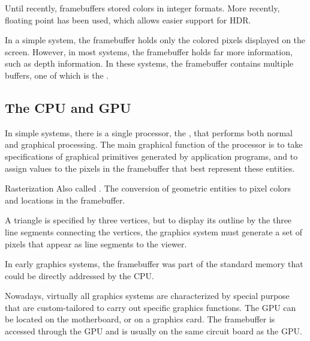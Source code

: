 \documentclass[../COS3712_Notes.tex]{subfiles}
\begin{document}
        Until recently, framebuffers stored colors in integer formats.
        More recently, floating point has been used, which allows easier support for HDR.

        In a simple system, the framebuffer holds only the colored pixels displayed on the screen.
        However, in most systems, the framebuffer holds far more information, such as depth
        information.
        In these systems, the framebuffer contains multiple buffers, one of which is the
        .

      \subsection{The CPU and GPU}
        In simple systems, there is a single processor, the ,
        that performs both normal and graphical processing.
        The main graphical function of the processor is to take specifications of graphical
        primitives generated by application programs,
        and to assign values to the pixels in the framebuffer that best represent these entities.

        \begin{definition}{Rasterization}
          Also called .
          The conversion of geometric entities to pixel colors and locations in the framebuffer.

          \begin{example}
            A triangle is specified by three vertices,
            but to display its outline by the three line segments connecting the vertices,
            the graphics system must generate a set of pixels that appear as line segments to the
            viewer.
          \end{example}
        \end{definition}

        In early graphics systems, the framebuffer was part of the standard memory
        that could be directly addressed by the CPU.

        Nowadays, virtually all graphics systems are characterized by special purpose
         that are custom-tailored
        to carry out specific graphics functions.
        The GPU can be located on the motherboard, or on a graphics card.
        The framebuffer is accessed through the GPU and is usually on the same circuit board
        as the GPU.
      \pagebreak
\end{document}
